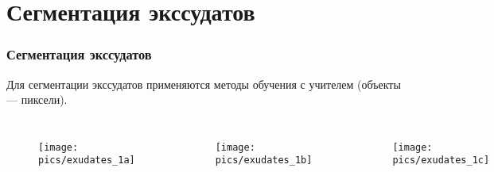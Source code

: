 \documentclass{beamer}
\begin{document}
\section{Сегментация экссудатов}

\begin{frame}
	\frametitle{Сегментация экссудатов}
	
	Для сегментации экссудатов применяются методы обучения с учителем (объекты --- пиксели).
	\begin{columns}[c]
			\begin{figure}
			\centering
			\texttt{[image: pics/exudates\_1a]}
			\label{fig:exudates_1a}
			\end{figure}
			\begin{figure}
			\centering
			\texttt{[image: pics/exudates\_1b]}
			\label{fig:exudates_1b}
			\end{figure}
			\begin{figure}
			\centering
			\texttt{[image: pics/exudates\_1c]}
			\label{fig:exudates_1c}
			\end{figure}
	\end{columns}
\end{frame}

\end{document}
